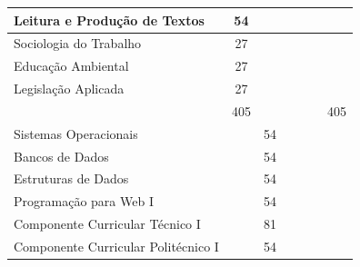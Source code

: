 \documentclass[11pt,fleqn]{book} %
\begin{document}
\begin{table}[]
{\begin{tabular}{@{}|l|c|c|c|c|c|c|@{}}
			Leitura e Produção de Textos                                  & 54                   &                      &                      &                      &                      &             \\ \midrule
			Sociologia do Trabalho                                        & 27                   &                      &                      &                      &                      &             \\ \midrule
			Educação Ambiental                                            & 27                   &                      &                      &                      &                      &             \\ \midrule
			Legislação Aplicada                                           & 27                   &                      &                      &                      &                      &             \\ \midrule
			& 405                  &                      &                      &                      &                      & 405         \\ \midrule
			Sistemas Operacionais                                         &                      & 54                   &                      &                      &                      &             \\ \midrule
			Bancos de Dados                                               &                      & 54                   &                      &                      &                      &             \\ \midrule
			Estruturas de Dados                                           &                      & 54                   &                      &                      &                      &             \\ \midrule
			Programação para Web I                                        &                      & 54                   &                      &                      &                      &             \\ \midrule
			Componente Curricular Técnico I                               &                      & 81                   &                      &                      &                      &             \\ \midrule
			Componente Curricular Politécnico I                           &                      & 54                   &                      &                      &                      &             \\ \midrule

\end{tabular}}
\end{table}
\end{document}
